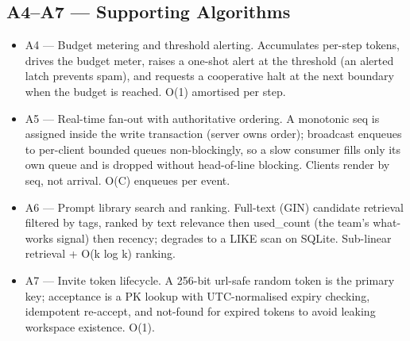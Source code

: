 \documentclass[12pt,a4paper]{report}
\begin{document}
\subsection{A4--A7 --- Supporting Algorithms}
\begin{itemize}
  \item A4 --- Budget metering and threshold alerting. Accumulates per-step tokens, drives the budget meter, raises a one-shot alert at the threshold (an alerted latch prevents spam), and requests a cooperative halt at the next boundary when the budget is reached. O(1) amortised per step.
  \item A5 --- Real-time fan-out with authoritative ordering. A monotonic seq is assigned inside the write transaction (server owns order); broadcast enqueues to per-client bounded queues non-blockingly, so a slow consumer fills only its own queue and is dropped without head-of-line blocking. Clients render by seq, not arrival. O(C) enqueues per event.
  \item A6 --- Prompt library search and ranking. Full-text (GIN) candidate retrieval filtered by tags, ranked by text relevance then used\_count (the team's what-works signal) then recency; degrades to a LIKE scan on SQLite. Sub-linear retrieval + O(k log k) ranking.
  \item A7 --- Invite token lifecycle. A 256-bit url-safe random token is the primary key; acceptance is a PK lookup with UTC-normalised expiry checking, idempotent re-accept, and not-found for expired tokens to avoid leaking workspace existence. O(1).
\end{itemize}
\end{document}
